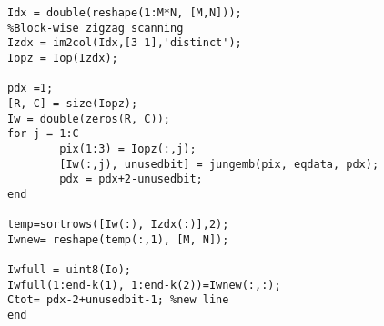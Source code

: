 \begin{appendices}
\begin{lstlisting}
Idx = double(reshape(1:M*N, [M,N]));
%Block-wise zigzag scanning
Izdx = im2col(Idx,[3 1],'distinct');
Iopz = Iop(Izdx);

pdx =1;
[R, C] = size(Iopz);
Iw = double(zeros(R, C));
for j = 1:C
        pix(1:3) = Iopz(:,j);
        [Iw(:,j), unusedbit] = jungemb(pix, eqdata, pdx);
        pdx = pdx+2-unusedbit;   
end

temp=sortrows([Iw(:), Izdx(:)],2);
Iwnew= reshape(temp(:,1), [M, N]);

Iwfull = uint8(Io);
Iwfull(1:end-k(1), 1:end-k(2))=Iwnew(:,:);
Ctot= pdx-2+unusedbit-1; %new line
end


\end{lstlisting}

\end{appendices}